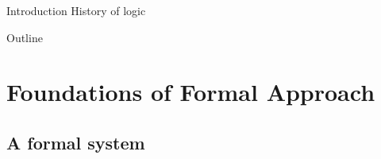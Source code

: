 \documentclass[aspectratio=169, 12pt, fleqn]{beamer}
\begin{document}
\begin{frame}{Introduction} {History of logic}
\begin{figure}
\end{figure}
\end{frame}

\begin{frame}{Outline}
  \tableofcontents
\end{frame}

\section{Foundations of Formal Approach}

\subsection{A formal system}
\end{document}

